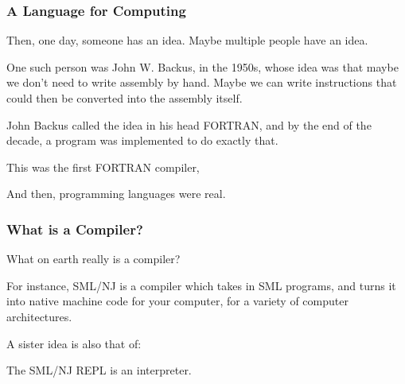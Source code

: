 \documentclass[aspectratio=169]{beamer}
\begin{document}
\begin{frame}[fragile]
  \frametitle{A Language for Computing}

  Then, one day, someone has an idea. Maybe multiple people have an idea.

  \vspace{\fill}

  One such person was John W. Backus, in the 1950s, whose idea was that
  maybe we don't need to write assembly by hand. Maybe we can write instructions
  that could then be converted into the assembly itself.

  \vspace{\fill}

  John Backus called the idea in his head FORTRAN, and by the end of the decade,
  a program was implemented to do exactly that.

  \vspace{\fill}

  This was the first FORTRAN compiler,

  \vspace{\fill}

  And then, programming languages were real.
\end{frame}


\begin{frame}[fragile]
  \frametitle{What is a Compiler?}

  What on earth really is a compiler?

  \vspace{\fill}


  \vspace{\fill}

  For instance, SML/NJ is a compiler which takes in SML programs, and turns it into
  native machine code for your computer, for a variety of computer architectures.

  \vspace{\fill}

  A sister idea is also that of:

  \vspace{\fill}

  The SML/NJ REPL is an interpreter.
\end{frame}
\end{document}
